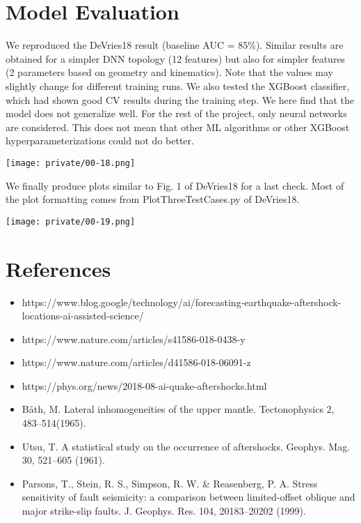 \documentclass[journal,transmag]{IEEEtran}
\begin{document}
\vspace{0.5em}
\section{Model Evaluation}
\vspace{0.5em}

We reproduced the DeVries18 result (baseline AUC = 85\%). Similar results are obtained for a simpler DNN topology (12 features) but also for simpler features (2 parameters based on geometry and kinematics). Note that the values may slightly change for different training runs.
We also tested the XGBoost classifier, which had shown good CV results during the training step. We here find that the model does not generalize well. For the rest of the project, only neural networks are considered. This does not mean that other ML algorithms or other XGBoost hyperparameterizations could not do better.

\texttt{[image: private/00-18.png]}

We finally produce plots similar to Fig. 1 of DeVries18 for a last check. Most of the plot formatting comes from PlotThreeTestCases.py of DeVries18.

\texttt{[image: private/00-19.png]}

\vspace{0.5em}
\section{References}
\begin{itemize}
  \item https://www.blog.google/technology/ai/forecasting-earthquake-aftershock-locations-ai-assisted-science/
  \item https://www.nature.com/articles/s41586-018-0438-y
  \item https://www.nature.com/articles/d41586-018-06091-z
  \item https://phys.org/news/2018-08-ai-quake-aftershocks.html
  \item Båth, M. Lateral inhomogeneities of the upper mantle. Tectonophysics 2, 483–514(1965).
  \item Utsu, T. A statistical study on the occurrence of aftershocks. Geophys. Mag. 30, 521–605 (1961).
  \item Parsons, T., Stein, R. S., Simpson, R. W. \& Reasenberg, P. A. Stress sensitivity of fault seismicity: a comparison between limited-offset oblique and major strike-slip faults. J. Geophys. Res. 104, 20183–20202 (1999).
\end{itemize}
\end{document}

